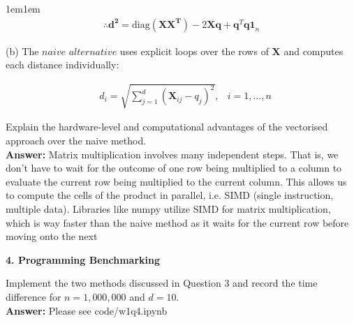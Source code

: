 \documentclass[11pt]{article}
\begin{document}
\begin{adjustwidth}{1em}{1em}
    \begin{align*}
        \therefore \mathbf{d^2} = \text{diag}(\mathbf{XX^T}) - 2\mathbf{Xq} 
        + \mathbf{q}^T\mathbf{q1}_n
    \end{align*}

    (b) The $\textit{naive alternative}$ uses explicit loops over the rows of $\mathbf{X}$ and 
    computes each distance individually:

    \begin{align*}
        &d_i = \sqrt{\sum_{j = 1}^d (\mathbf{X}_{ij} - q_j)^2}, &i = 1,\dots,n
    \end{align*}

    Explain the hardware-level and computational advantages of the vectorised approach over the 
    naive method. \\ 

    \textbf{Answer:} Matrix multiplication involves many independent steps. That is, we don't 
    have to wait
    for the outcome of one row being multiplied to a column to evaluate the current row
    being multiplied to the current column. This allows us to compute the cells of the 
    product in parallel, i.e. SIMD (single instruction, multiple data). Libraries like
    numpy utilize SIMD for matrix multiplication, which is way faster than the naive method
    as it waits for the current row before moving onto the next \\

    \end{adjustwidth}

    \textbf{4. Programming Benchmarking}

    Implement the two methods discussed in Question 3 and record the time difference for 
    $n = 1,000,000$ and $d = 10$. \\ 

    \textbf{Answer:} Please see code/w1q4.ipynb
\end{document}
